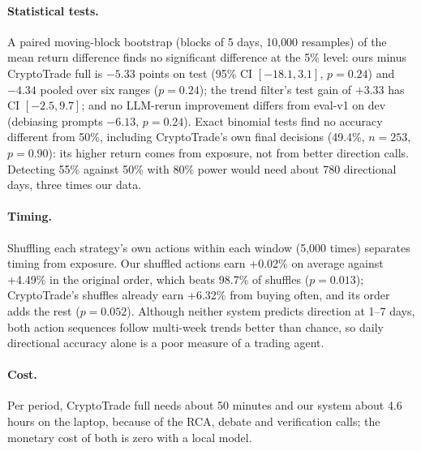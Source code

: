 \documentclass[11pt]{article}
\begin{document}
\paragraph{Statistical tests.} A paired moving-block bootstrap (blocks of 5 days, 10{,}000 resamples) of the mean
return difference finds no significant difference at the 5\% level: ours minus CryptoTrade full is $-5.33$ points on
test (95\% CI $[-18.1, 3.1]$, $p=0.24$) and $-4.34$ pooled over six ranges ($p=0.24$); the trend filter's test gain of
$+3.33$ has CI $[-2.5, 9.7]$; and no LLM-rerun improvement differs from eval-v1 on dev (debiasing prompts $-6.13$,
$p=0.24$). Exact binomial tests find no accuracy different from 50\%, including CryptoTrade's own final decisions (49.4\%,
$n=253$, $p=0.90$): its higher return comes from exposure, not from better direction calls. Detecting 55\% against 50\%
with 80\% power would need about 780 directional days, three times our data.

\paragraph{Timing.} Shuffling each strategy's own actions within each window (5{,}000 times) separates timing from
exposure. Our shuffled actions earn +0.02\% on average against +4.49\% in the original order, which beats 98.7\% of
shuffles ($p=0.013$); CryptoTrade's shuffles already earn +6.32\% from buying often, and its order adds the rest
($p=0.052$). Although neither system predicts direction at 1--7 days, both action sequences follow multi-week trends
better than chance, so daily directional accuracy alone is a poor measure of a trading agent.

\paragraph{Cost.} Per period, CryptoTrade full needs about 50 minutes and our system about 4.6 hours on the laptop,
because of the RCA, debate and verification calls; the monetary cost of both is zero with a local model.

\end{document}
